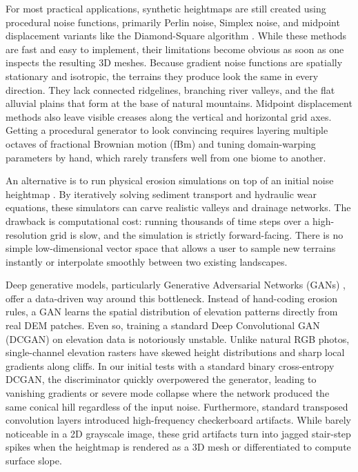 \documentclass[conference]{IEEEtran}
\begin{document}
For most practical applications, synthetic heightmaps are still created using procedural noise functions, primarily Perlin noise, Simplex noise, and midpoint displacement variants like the Diamond-Square algorithm \cite{b3, b4, b8}. While these methods are fast and easy to implement, their limitations become obvious as soon as one inspects the resulting 3D meshes. Because gradient noise functions are spatially stationary and isotropic, the terrains they produce look the same in every direction. They lack connected ridgelines, branching river valleys, and the flat alluvial plains that form at the base of natural mountains. Midpoint displacement methods also leave visible creases along the vertical and horizontal grid axes. Getting a procedural generator to look convincing requires layering multiple octaves of fractional Brownian motion (fBm) and tuning domain-warping parameters by hand, which rarely transfers well from one biome to another.

An alternative is to run physical erosion simulations on top of an initial noise heightmap \cite{b5, b6}. By iteratively solving sediment transport and hydraulic wear equations, these simulators can carve realistic valleys and drainage networks. The drawback is computational cost: running thousands of time steps over a high-resolution grid is slow, and the simulation is strictly forward-facing. There is no simple low-dimensional vector space that allows a user to sample new terrains instantly or interpolate smoothly between two existing landscapes.

Deep generative models, particularly Generative Adversarial Networks (GANs) \cite{b7}, offer a data-driven way around this bottleneck. Instead of hand-coding erosion rules, a GAN learns the spatial distribution of elevation patterns directly from real DEM patches. Even so, training a standard Deep Convolutional GAN (DCGAN) on elevation data is notoriously unstable. Unlike natural RGB photos, single-channel elevation rasters have skewed height distributions and sharp local gradients along cliffs. In our initial tests with a standard binary cross-entropy DCGAN, the discriminator quickly overpowered the generator, leading to vanishing gradients or severe mode collapse where the network produced the same conical hill regardless of the input noise. Furthermore, standard transposed convolution layers introduced high-frequency checkerboard artifacts. While barely noticeable in a 2D grayscale image, these grid artifacts turn into jagged stair-step spikes when the heightmap is rendered as a 3D mesh or differentiated to compute surface slope.
\end{document}
